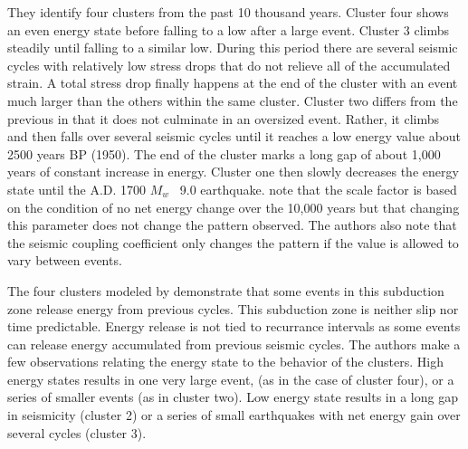 \documentclass[draft,jgrga]{agutex}
\begin{document}
They identify four clusters from the past 10 thousand years. Cluster four shows an even energy state before falling to a low after a large event. Cluster 3 climbs steadily until falling to a similar low. During this period there are several seismic cycles with relatively low stress drops that do not relieve all of the accumulated strain. A total stress drop finally happens at the end of the cluster with an event much larger than the others within the same cluster. Cluster two differs from the previous in that it does not culminate in an oversized event. Rather, it climbs and then falls over several seismic cycles until it reaches a low energy value about 2500 years BP (1950). The end of the cluster marks a long gap of about 1,000 years of constant increase in energy. Cluster one then slowly decreases the energy state until the A.D. 1700 $M_w$ ~9.0 earthquake. \citep{Goldfinger2013} note that the scale factor is based on the condition of no net energy change over the 10,000 years but that changing this parameter does not change the pattern observed. The authors also note that the seismic coupling coefficient only changes the pattern if the value is allowed to vary between events. 

The four clusters modeled by \citet{Goldfinger2013} demonstrate that some events in this subduction zone release energy from previous cycles. This subduction zone is neither slip nor time predictable. Energy release is not tied to recurrance intervals as some events can release energy accumulated from previous seismic cycles. The authors make a few observations relating the energy state to the behavior of the clusters. High energy states results in one very large event, (as in the case of cluster four), or a series of smaller events (as in cluster two). Low energy state results in a long gap in seismicity (cluster 2) or a series of small earthquakes with net energy gain over several cycles (cluster 3). 
\end{document}
